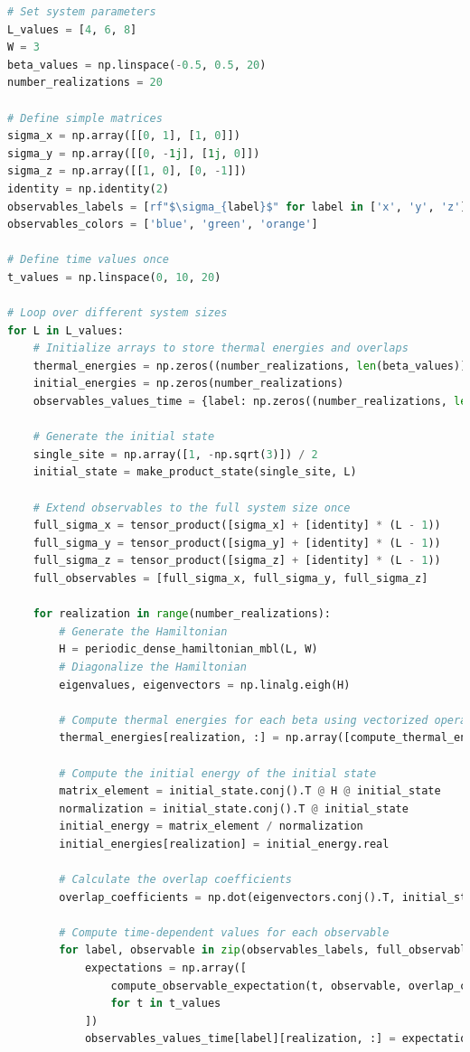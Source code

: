 \documentclass[12pt]{article}
\begin{document}
\begin{lstlisting}[language=Python]
# Set system parameters
L_values = [4, 6, 8]
W = 3
beta_values = np.linspace(-0.5, 0.5, 20)
number_realizations = 20

# Define simple matrices
sigma_x = np.array([[0, 1], [1, 0]])
sigma_y = np.array([[0, -1j], [1j, 0]])
sigma_z = np.array([[1, 0], [0, -1]])
identity = np.identity(2)
observables_labels = [rf"$\sigma_{label}$" for label in ['x', 'y', 'z']]
observables_colors = ['blue', 'green', 'orange']

# Define time values once
t_values = np.linspace(0, 10, 20)

# Loop over different system sizes
for L in L_values:
    # Initialize arrays to store thermal energies and overlaps
    thermal_energies = np.zeros((number_realizations, len(beta_values)))
    initial_energies = np.zeros(number_realizations)
    observables_values_time = {label: np.zeros((number_realizations, len(t_values))) for label in observables_labels}
    
    # Generate the initial state
    single_site = np.array([1, -np.sqrt(3)]) / 2
    initial_state = make_product_state(single_site, L)
    
    # Extend observables to the full system size once
    full_sigma_x = tensor_product([sigma_x] + [identity] * (L - 1))
    full_sigma_y = tensor_product([sigma_y] + [identity] * (L - 1))
    full_sigma_z = tensor_product([sigma_z] + [identity] * (L - 1))
    full_observables = [full_sigma_x, full_sigma_y, full_sigma_z]

    for realization in range(number_realizations):
        # Generate the Hamiltonian
        H = periodic_dense_hamiltonian_mbl(L, W)
        # Diagonalize the Hamiltonian
        eigenvalues, eigenvectors = np.linalg.eigh(H)
        
        # Compute thermal energies for each beta using vectorized operations
        thermal_energies[realization, :] = np.array([compute_thermal_energy(beta, eigenvalues) for beta in beta_values])
        
        # Compute the initial energy of the initial state
        matrix_element = initial_state.conj().T @ H @ initial_state
        normalization = initial_state.conj().T @ initial_state
        initial_energy = matrix_element / normalization
        initial_energies[realization] = initial_energy.real
        
        # Calculate the overlap coefficients
        overlap_coefficients = np.dot(eigenvectors.conj().T, initial_state)
        
        # Compute time-dependent values for each observable
        for label, observable in zip(observables_labels, full_observables):
            expectations = np.array([
                compute_observable_expectation(t, observable, overlap_coefficients, eigenvalues, eigenvectors).real
                for t in t_values
            ])
            observables_values_time[label][realization, :] = expectations


\end{lstlisting}
\end{document}
